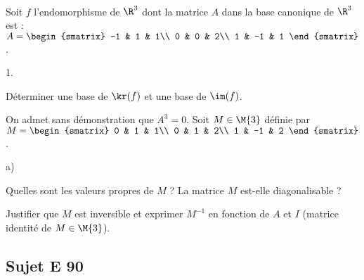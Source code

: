 \documentclass[11pt]{article}
\begin{document}

\begin{exerciceSP}~\\
Soit $f$ l'endomorphisme de $\R^3$ dont la matrice $A$ dans la base 
canonique de $\R^3$ est : $A=
\begin{smatrix}
  -1 & 1 & 1\\ 
  0 & 0 & 2\\ 
  1 & -1 & 1
\end{smatrix}$.
\begin{noliste}{1.}
    \setlength{\itemsep}{2mm}
  \item Déterminer une base de $\kr(f)$ et une base de $\im(f)$.
  
  \item On admet sans démonstration que $A^3=0$. Soit $M\in\M{3}$ 
  définie par $M=
  \begin{smatrix}
    0 & 1 & 1\\ 
    0 & 1 & 2\\ 
    1 & -1 & 2
  \end{smatrix}$.
  \begin{noliste}{a)}
    \setlength{\itemsep}{2mm}
    \item Quelles sont les valeurs propres de $M$ ? La matrice $M$ 
    est-elle diagonalisable ?
    
    \item Justifier que $M$ est inversible et exprimer $M^{-1}$ en 
    fonction de $A$ et $I$ (matrice identité de $M\in\M{3}$).
  \end{noliste}
\end{noliste}
\end{exerciceSP}



\newpage



\subsection*{Sujet E 90}

\end{document}
